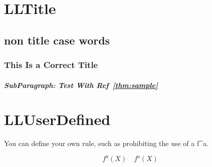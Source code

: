 \documentclass[a4paper, 10pt]{article}
\begin{document}
\section{LLTitle}

\subsection{non title case words}

\subsubsection{
    This Is a Correct Title
}

\subparagraph{SubParagraph: Test With Ref~\ref{thm:sample}}

\section{LLUserDefined}

You can define your own rule, such as prohibiting the use of a f\^{}a.

\begin{equation*}
    f^a(X) \quad f^{\mathrm{a}}(X)
\end{equation*}
\end{document}
